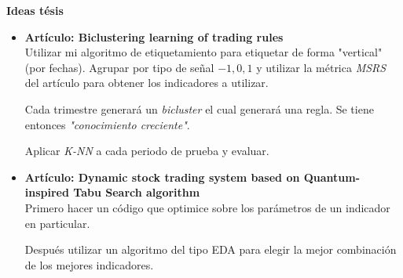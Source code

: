 \documentclass[10pt,letterpaper]{article}
\author{David Ricardo Montalván Hernández}
\begin{document}
\begin{center}
\textbf{Ideas tésis}
\end{center}

\begin{itemize}
\item \textbf{Artículo: Biclustering learning of trading rules} \\

Utilizar mi algoritmo de etiquetamiento para etiquetar de forma "vertical" (por fechas). Agrupar por tipo de señal $-1,0,1$ y utilizar la métrica \textit{MSRS} del artículo para obtener los indicadores a utilizar.

Cada trimestre generará un \textit{bicluster} el cual generará una regla. Se tiene entonces \textit{"conocimiento creciente"}.

Aplicar \textit{K-NN} a cada periodo de prueba y evaluar.

\item \textbf{Artículo: Dynamic stock trading system based on Quantum-inspired Tabu Search algorithm} \\

Primero hacer un código que optimice sobre los parámetros de un indicador en particular.

Después utilizar un algoritmo del tipo EDA para elegir la mejor combinación de los mejores indicadores.

\end{itemize}
\end{document}
